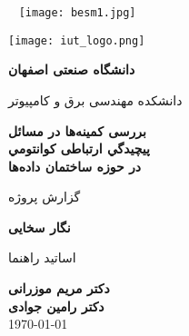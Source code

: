 

\thispagestyle{empty}
\mbox{}
\pagebreak

\thispagestyle{empty}
\begin{center}
	~\vfill
	\texttt{[image: besm1.jpg]}
	~\vfill
\end{center}
\pagebreak

\thispagestyle{empty}
\begin{center}
\texttt{[image: iut\_logo.png]}
\vspace{0.4cm}

\textbf{دانشگاه صنعتی اصفهان}\\
\vspace{0.4cm}

{\large

	دانشکده مهندسی برق و کامپیوتر
}
\vspace{3cm}

\Huge{\textbf{بررسی کمینه‌ها در مسائل }}\\
\vspace{0.5cm}
{\Huge
	\textbf{پيچيدگي ارتباطی كوانتومي }\\
}
\vspace{0.5cm}
\Huge{\textbf{در حوزه ساختمان داده‌ها}}
\vspace{2.5cm}

{\huge
	گزارش پروژه\\
}
\vspace{1cm}

{\Large
	\textbf{نگار سخایی}\\
}
\vspace{1.5cm}

{\Large
	 اساتید راهنما\\
}
\vspace{0.8cm}

{\Large
	\textbf{دکتر مریم موزرانی}\\

}
\vspace{0.5cm}
{\Large
	\textbf{دکتر رامین جوادی}\\

}
\vspace{1.5cm}
\large{\today}




\end{center}
\restoregeometry
\pagebreak


